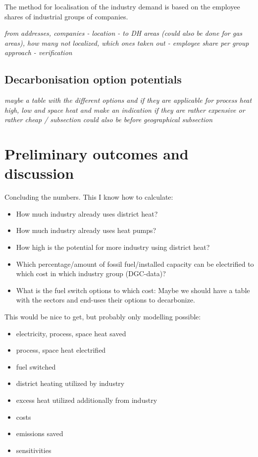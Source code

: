 \documentclass[review]{elsarticle}
\begin{document}
The method for localisation of the industry demand is based on the employee shares of industrial groups of companies.

\textit{from addresses, companies - location - to DH areas (could also be done for gas areas), how many not localized, which ones taken out - employee share per group approach - verification}


\subsection{Decarbonisation option potentials}
\textit{maybe a table with the different options and if they are applicable for process heat high, low and space heat and make an indication if they are rather expensive or rather cheap / subsection could also be before geographical subsection}



\section{Preliminary outcomes and discussion} \label{outcdisc}
Concluding the numbers. This I know how to calculate:
\begin{itemize}
    \item How much industry already uses district heat?
    \item How much industry already uses heat pumps?
    \item How high is the potential for more industry using district heat?
    \item Which percentage/amount of fossil fuel/installed capacity can be electrified to which cost in which industry group (DGC-data)?
    \item What is the fuel switch options to which cost: Maybe we should have a table with the sectors and end-uses their options to decarbonize.
\end{itemize}
This would be nice to get, but probably only modelling possible:
\begin{itemize}
    \item electricity, process, space heat saved
    \item process, space heat electrified
    \item fuel switched
    \item district heating utilized by industry
    \item excess heat utilized additionally from industry
    \item costs
    \item emissions saved
    \item sensitivities
\end{itemize}
\end{document}
